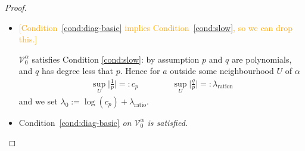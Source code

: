 \documentclass{article}
\theoremstyle{plain}
\newcommand{\hardpart}{\mathcal{V}_0}
\newenvironment{verify}{\color{ForestGreen}}{\color{black}}
\begin{document}
\begin{proof}
\begin{itemize}
is bounded as $a,a'$ approach $\zeta=\alpha$.
\begin{verify}
\par Proof of Ahlfors exercise. First, observe that
\begin{align*}
P(t) &= (t + \beta_1) \cdots (t + \beta_d) \\
P'(t) &= \sum_k \left[ \prod_{j \neq k} (t + \beta_j) \right] \\
P'(-\beta_1) &= \prod_{j\neq 1} (-\beta_1 + \beta_j) 
\end{align*}
Then we see that
\begin{align*}
\frac{1}{P(t)} & = \sum_{j} \frac{\pi_j}{t + \beta_j}\\
-\frac{P'(t)}{P(t)^2} &= -\sum_{j} \frac{\pi_\beta}{(t + \beta_j)^2}\\
P'(t) &= \sum_{j} \pi_j \left(\frac{P(t)}{t + \beta_j}\right)^2\\
P'(-\beta_1) &=  \pi_1 \prod_{j\neq 1} (-\beta_1+\beta_j)^2\\
\frac{1}{P'(-\beta_1)} &= \pi_1
\end{align*}
\end{verify}
\color{Tan}
\item \textcolor{orange}{[Condition~\eqref{cond:diag-basic} implies Condition~\eqref{cond:slow}, so we can drop this.]}

$\hardpart^\alpha$ satisfies Condition \eqref{cond:slow}: by assumption $p$ and $q$ are polynomials, and $q$ has degree less that $p$. Hence for $a$ outside some neighbourhood $U$ of $\alpha$  
\begin{align*}
\sup_U \Big\vert \frac{1}{p}\Big\vert =:c_p \qquad\qquad \sup_U \Big\vert\frac{q}{p}\Big\vert =:\lambda_\text{ration} 
\end{align*}
and we set $\lambda_0:=\log(c_p)+\lambda_\text{ratio}$.
\color{black}
\item Condition~\eqref{cond:diag-basic} {\em on $\hardpart^\alpha$ is satisfied.}


\end{itemize}
\end{proof}
\end{document}
